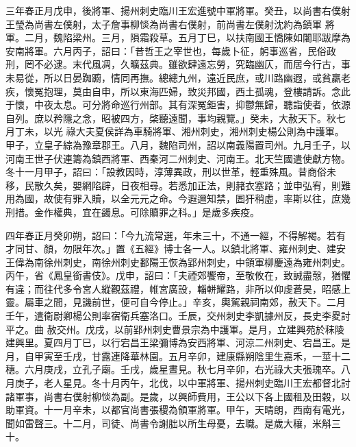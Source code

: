 \begin{pinyinscope}
 三年春正月戊申，後將軍、揚州刺史臨川王宏進號中軍將軍。癸丑，以尚書右僕射王瑩為尚書左僕射，太子詹事柳惔為尚書右僕射，前尚書左僕射沈約為鎮軍
 將軍。二月，魏陷梁州。三月，隕霜殺草。五月丁巳，以扶南國王憍陳如闍耶跋摩為安南將軍。六月丙子，詔曰：「昔哲王之宰世也，每歲卜征，躬事巡省，民俗政刑，罔不必逮。末代風凋，久曠茲典。雖欲肆遠忘勞，究臨幽仄，而居今行古，事未易從，所以日晏踟躕，情同再撫。總總九州，遠近民庶，或川路幽遐，或貧羸老疾，懷冤抱理，莫由自申，所以東海匹婦，致災邦國，西土孤魂，登樓請訴。念此于懷，中夜太息。可分將命巡行州部。其有深冤鉅害，抑鬱無歸，聽詣使者，依源自列。庶以矜隱之念，昭被四方，棨聽遠聞，事均親覽。」癸未，大赦天下。秋七月丁未，以光
 祿大夫夏侯詳為車騎將軍、湘州刺史，湘州刺史楊公則為中護軍。甲子，立皇子綜為豫章郡王。八月，魏陷司州，詔以南義陽置司州。九月壬子，以河南王世子伏連籌為鎮西將軍、西秦河二州刺史、河南王。北天竺國遣使獻方物。冬十一月甲子，詔曰：「設教因時，淳薄異政，刑以世革，輕重殊風。昔商俗未移，民散久矣，嬰網陷辟，日夜相尋。若悉加正法，則赭衣塞路；並申弘宥，則難用為國，故使有罪入贖，以全元元之命。今遐邇知禁，圄犴稍虛，率斯以往，庶幾刑措。金作權典，宜在蠲息。可除贖罪之科。」是歲多疾疫。



 四年春正月癸卯朔，詔曰：「今九流常選，年未三十，不通一經，不得解褐。若有才同甘、顏，勿限年次。」置《五經》博士各一人。以鎮北將軍、雍州刺史、建安王偉為南徐州刺史，南徐州刺史鄱陽王恢為郢州刺史，中領軍柳慶遠為雍州刺史。丙午，省《鳳皇銜書伎》。戊申，詔曰：「夫禋郊饗帝，至敬攸在，致誠盡愨，猶懼有違；而往代多令宮人縱觀茲禮，帷宮廣設，輜軿耀路，非所以仰虔蒼昊，昭感上靈。屬車之間，見譏前世，便可自今停止。」辛亥，輿駕親祠南郊，赦天下。二月壬午，遣衛尉卿楊公則率宿衛兵塞洛口。壬辰，交州刺史李凱據州反，長史李畟討平之。曲
 赦交州。戊戌，以前郢州刺史曹景宗為中護軍。是月，立建興苑於秣陵建興里。夏四月丁巳，以行宕昌王梁彌博為安西將軍、河涼二州刺史、宕昌王。是月，自甲寅至壬戌，甘露連降華林園。五月辛卯，建康縣朔陰里生嘉禾，一莖十二穗。六月庚戌，立孔子廟。壬戌，歲星晝見。秋七月辛卯，右光祿大夫張瑰卒。八月庚子，老人星見。冬十月丙午，北伐，以中軍將軍、揚州刺史臨川王宏都督北討諸軍事，尚書右僕射柳惔為副。是歲，以興師費用，王公以下各上國租及田穀，以助軍資。十一月辛未，以都官尚書張稷為領軍將軍。甲午，天晴朗，西南有電光，
 聞如雷聲三。十二月，司徒、尚書令謝朏以所生母憂，去職。是歲大穰，米斛三十。




\end{pinyinscope}
